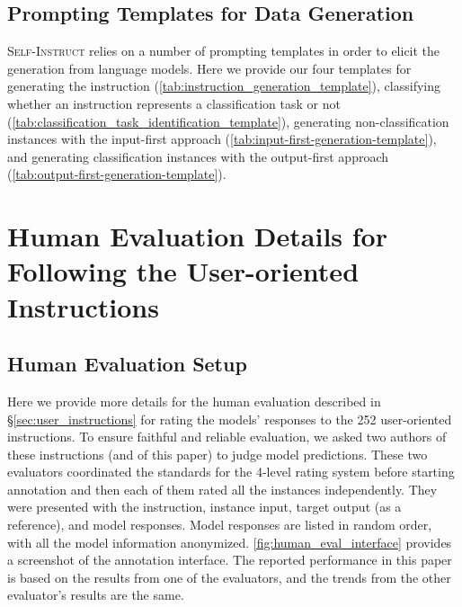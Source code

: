 \documentclass[11pt]{article}
\newcommand{\name}{\textsc{Self-Instruct}}
\begin{document}
\subsection{Prompting Templates for Data Generation}
\label{sec:prompting_templates}

\name{} relies on a number of prompting templates in order to elicit the generation from language models. Here we provide our four templates for generating the instruction (\autoref{tab:instruction_generation_template}), classifying whether an instruction represents a classification task or not (\autoref{tab:classification_task_identification_template}), generating non-classification instances with the input-first approach (\autoref{tab:input-first-generation-template}), and generating classification instances with the output-first approach (\autoref{tab:output-first-generation-template}).






\clearpage
\section{Human Evaluation Details for Following the User-oriented Instructions}
\label{sec:human_eval_details}

\subsection{Human Evaluation Setup}
Here we provide more details for the human evaluation described in \S\ref{sec:user_instructions} for rating the models' responses to the 252 user-oriented instructions. To ensure faithful and reliable evaluation, we asked two authors of these instructions (and of this paper) to judge model predictions. These two evaluators coordinated the standards for the 4-level rating system before starting annotation and then each of them rated all the instances independently. They were presented with the instruction, instance input, target output (as a reference), and model responses. Model responses are listed in random order, with all the model information anonymized.  
\autoref{fig:human_eval_interface} provides a screenshot of the annotation interface. The reported performance in this paper is based on the results from one of the evaluators, and the trends from the other evaluator's results are the same.
\end{document}
